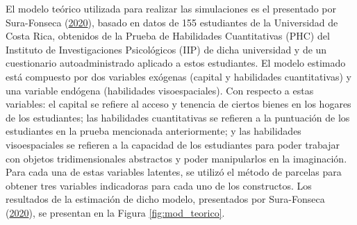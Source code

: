 \documentclass[
  english]{revcoles}
\begin{document}
El modelo teórico utilizada para realizar las simulaciones es el
presentado por Sura-Fonseca (\protect\hyperlink{ref-sura}{2020}), basado
en datos de 155 estudiantes de la Universidad de Costa Rica, obtenidos
de la Prueba de Habilidades Cuantitativas (PHC) del Instituto de
Investigaciones Psicológicos (IIP) de dicha universidad y de un
cuestionario autoadministrado aplicado a estos estudiantes. El modelo
estimado está compuesto por dos variables exógenas (capital y
habilidades cuantitativas) y una variable endógena (habilidades
visoespaciales). Con respecto a estas variables: el capital se refiere
al acceso y tenencia de ciertos bienes en los hogares de los
estudiantes; las habilidades cuantitativas se refieren a la puntuación
de los estudiantes en la prueba mencionada anteriormente; y las
habilidades visoespaciales se refieren a la capacidad de los estudiantes
para poder trabajar con objetos tridimensionales abstractos y poder
manipularlos en la imaginación. Para cada una de estas variables
latentes, se utilizó el método de parcelas para obtener tres variables
indicadoras para cada uno de los constructos. Los resultados de la
estimación de dicho modelo, presentados por Sura-Fonseca
(\protect\hyperlink{ref-sura}{2020}), se presentan en la Figura
\ref{fig:mod_teorico}.
\end{document}
